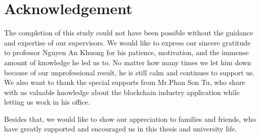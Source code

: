 \chapter*{Acknowledgement}
\thispagestyle{empty}
\label{Acknowledgement}
\hspace*{5cm}

The completion of this study could not have been possible without the guidance and expertise of our supervisors. We would like to express our sincere gratitude to professor Nguyen An Khuong for his patience, motivation, and the immense amount of knowledge he led us to. No matter how many times we let him down because of our unprofessional result, he is still calm and continues to support us. We also want to thank the special supports from Mr.Phan Son Tu, who share with us valuable knowledge about the blockchain industry application while letting us work in his office.

Besides that, we would like to show our appreciation to families and friends, who have greatly supported and encouraged us in this thesis and university life.


\cleardoublepage